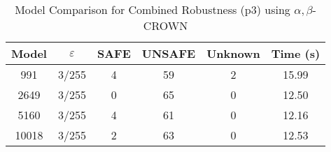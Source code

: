 \begin{table}[htbp]
\centering
\caption{Model Comparison for Combined Robustness (p3) using $\alpha,\beta$-CROWN}
\label{tab:p3_abcrown_model_comparison}
\begin{tabular}{|c|c|c|c|c|c|}
\hline
Model & $\varepsilon$ & SAFE & UNSAFE & Unknown & Time (s) \\ \hline
991 & 3/255 & 4 & 59 & 2 & 15.99 \\ \hline
2649 & 3/255 & 0 & 65 & 0 & 12.50 \\ \hline
5160 & 3/255 & 4 & 61 & 0 & 12.16 \\ \hline
10018 & 3/255 & 2 & 63 & 0 & 12.53 \\ \hline
\end{tabular}
\end{table}
